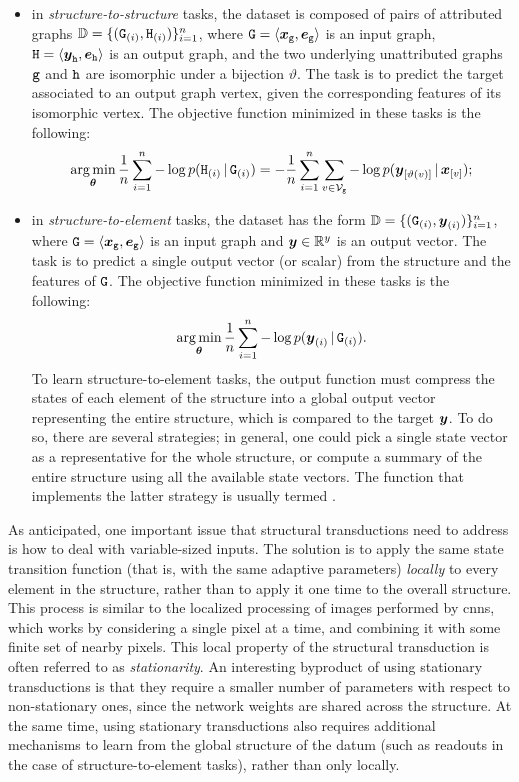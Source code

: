 \begin{itemize}
    \item in \emph{structure-to-structure} tasks, the dataset is composed of pairs of attributed graphs $\Data = \{(\PatternGraph{g}{i}, \PatternGraph{h}{i})\}_{i=1}^n$, where $\GraphU{g} = \VectorGraph{x}{g}$ is an input graph, $\GraphU{h} = \VectorGraph{y}{h}$ is an output graph, and the two underlying unattributed graphs $\mathtt{g}$ and $\mathtt{h}$ are isomorphic under a bijection $\vartheta$. The task is to predict the target associated to an output graph vertex, given the corresponding features of its isomorphic vertex. The objective function minimized in these tasks is the following:
    $$\argmin_{\Param} \frac{1}{n} \sum_{i=1}^n -\log p(\PatternGraph{h}{i} \given \PatternGraph{g}{i}) = -\frac{1}{n} \sum_{i=1}^n \sum_{v \in \Nodes{g}} -\log p(\Elem{y}{\vartheta(v)} \given \Elem{x}{v});$$
    \item in \emph{structure-to-element} tasks, the dataset has the form  $\Data = \{(\PatternGraph{g}{i}, \PatternVector{y}{i})\}_{i=1}^n$, where $\GraphU{g} = \VectorGraph{x}{g}$ is an input graph and $\Vector{y} \in \Real^y$ is an output vector. The task is to predict a single output vector (or scalar) from the structure and the features of $\GraphU{g}$. The  objective function minimized in these tasks is the following:
    $$\argmin_{\Param} \frac{1}{n} \sum_{i=1}^n - \log p(\PatternVector{y}{i} \given \PatternGraph{g}{i}).$$
    To learn structure-to-element tasks, the output function must compress the states of each element of the structure into a global output vector representing the entire structure, which is compared to the target $\Vector{y}$. To do so, there are several strategies; in general, one could pick a single state vector as a representative for the whole structure, or compute a summary of the entire structure using all the available state vectors. The function that implements the latter strategy is usually termed .
\end{itemize}

As anticipated, one important issue that structural transductions need to address is how to deal with variable-sized inputs. The solution is to apply the same state transition function (that is, with the same adaptive parameters) \emph{locally} to every element in the structure, rather than to apply it one time to the overall structure. This process is similar to the localized processing of images performed by \glspl{cnn}, which works by considering a single pixel at a time, and combining it with some finite set of nearby pixels. This local property of the structural transduction is often referred to as \emph{stationarity}. An interesting byproduct of using stationary transductions is that they require a smaller number of parameters with respect to non-stationary ones, since the network weights are shared across the structure. At the same time, using stationary transductions also requires additional mechanisms to learn from the global structure of the datum (such as readouts in the case of structure-to-element tasks), rather than only locally.

